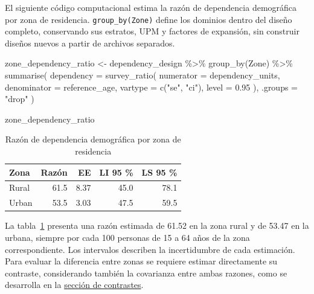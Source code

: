 \documentclass[
  spanish,
  11pt,
  letterpaper,
  oneside,
  open=any]{scrbook}
\newenvironment{Shaded}{\begin{snugshade}}{\end{snugshade}}
\newcommand{\AttributeTok}[1]{\textcolor[rgb]{0.40,0.45,0.13}{#1}}
\newcommand{\FloatTok}[1]{\textcolor[rgb]{0.68,0.00,0.00}{#1}}
\newcommand{\FunctionTok}[1]{\textcolor[rgb]{0.28,0.35,0.67}{#1}}
\newcommand{\NormalTok}[1]{\textcolor[rgb]{0.00,0.23,0.31}{#1}}
\newcommand{\OtherTok}[1]{\textcolor[rgb]{0.00,0.23,0.31}{#1}}
\newcommand{\SpecialCharTok}[1]{\textcolor[rgb]{0.37,0.37,0.37}{#1}}
\newcommand{\StringTok}[1]{\textcolor[rgb]{0.13,0.47,0.30}{#1}}
\begin{document}
El siguiente código computacional estima la razón de dependencia
demográfica por zona de residencia. \texttt{group\_by(Zone)} define los
dominios dentro del diseño completo, conservando sus estratos, UPM y
factores de expansión, sin construir diseños nuevos a partir de archivos
separados.

\begin{Shaded}
\begin{Highlighting}[]
\NormalTok{zone\_dependency\_ratio }\OtherTok{\textless{}{-}}\NormalTok{ dependency\_design }\SpecialCharTok{\%\textgreater{}\%}
  \FunctionTok{group\_by}\NormalTok{(Zone) }\SpecialCharTok{\%\textgreater{}\%}
  \FunctionTok{summarise}\NormalTok{(}
    \AttributeTok{dependency =} \FunctionTok{survey\_ratio}\NormalTok{(}
      \AttributeTok{numerator =}\NormalTok{ dependency\_units,}
      \AttributeTok{denominator =}\NormalTok{ reference\_age,}
      \AttributeTok{vartype =} \FunctionTok{c}\NormalTok{(}\StringTok{"se"}\NormalTok{, }\StringTok{"ci"}\NormalTok{),}
      \AttributeTok{level =} \FloatTok{0.95}
\NormalTok{    ),}
    \AttributeTok{.groups =} \StringTok{"drop"}
\NormalTok{  )}

\NormalTok{zone\_dependency\_ratio}
\end{Highlighting}
\end{Shaded}

{

\begin{longtable}[]{@{}lrrrr@{}}

\caption{\label{tbl-razon-dependencia-zona}Razón de dependencia
demográfica por zona de residencia}

\tabularnewline

\toprule\noalign{}
Zona & Razón & EE & LI 95 \% & LS 95 \% \\
\midrule\noalign{}
\endhead
\bottomrule\noalign{}
\endlastfoot
Rural & 61.5 & 8.37 & 45.0 & 78.1 \\
Urban & 53.5 & 3.03 & 47.5 & 59.5 \\

\end{longtable}

}

La tabla~\ref{tbl-razon-dependencia-zona} presenta una razón estimada de
61.52 en la zona rural y de 53.47 en la urbana, siempre por cada 100
personas de 15 a 64 años de la zona correspondiente. Los intervalos
describen la incertidumbre de cada estimación. Para evaluar la
diferencia entre zonas se requiere estimar directamente su contraste,
considerando también la covarianza entre ambas razones, como se
desarrolla en la \hyperref[estimacion-de-contrastes]{sección de
contrastes}.
\end{document}
